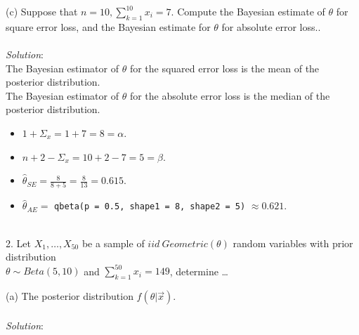 \documentclass[12pt]{article}
\newcommand{\XB}{\color{black}}
\newcommand{\XBB}{\color{blue}}
\newcommand{\ds}{\displaystyle}
\begin{document}
\vspace{2.5mm}

(c) Suppose that $ n = 10, \sum_{k=1}^{10} x_{i} = 7 $. Compute the Bayesian estimate of $ \theta $
for square error loss, and the Bayesian estimate for $ \theta $ for absolute error loss.. \\
\vspace{2.5mm} \\
\textit{Solution}:
\vspace{2.5mm} \\

\noindent
The Bayesian estimator of $ \theta $ for the squared error loss is the mean of the posterior distribution. \\
\noindent
The Bayesian estimator of $ \theta $ for the absolute error loss is the median of the posterior distribution. \\

\begin{itemize}
    \item $ \ds 1 + \Sigma_{x} = 1 + 7 = 8 = \alpha $.
    \item $ \ds n + 2 - \Sigma_{x} = 10 + 2 - 7 = 5 = \beta $.
    \item $ \ds \hat{\theta}_{SE} = \frac{8}{8 + 5} = \frac{8}{13} = 0.615 $.
    \item $ \ds \hat{\theta}_{AE} = $ {\XBB \texttt{qbeta(p = 0.5, shape1 = 8, shape2 = 5)}} $ \approx 0.621 $.
\end{itemize}

\vspace{2.5mm}

\newpage
\XBB\hrulefill\XB \\

2.  Let $ X_{1}, \dots , X_{50} $ be a sample of $ iid \ Geometric(\theta) $ random variables
with prior distribution \\ $ \theta \sim Beta(5, 10) $ and $\sum_{k=1}^{50} x_{i} = 149 $, determine \dots \\

\XBB\hrulefill\XB
\vspace{5mm}

(a) The posterior distribution $ f(\theta | \overrightarrow{x}) $. \\
\vspace{2.5mm} \\
\textit{Solution}:
\vspace{2.5mm} \\
\end{document}
